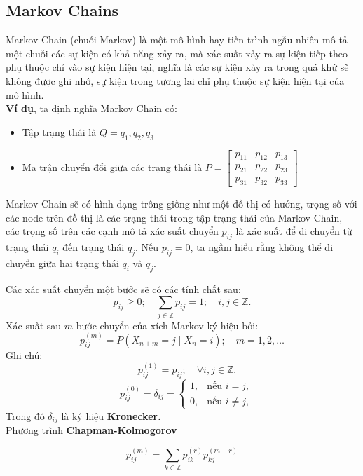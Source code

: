 \documentclass[conference]{IEEEtran}
\begin{document}
\subsection{Markov Chains}
Markov Chain (chuỗi Markov) là một mô hình hay tiến trình ngẫu nhiên mô tả một chuỗi các sự kiện có khả năng xảy ra, mà xác suất xảy ra sự kiện tiếp theo phụ thuộc chỉ vào sự kiện hiện tại, nghĩa là các sự kiện xảy ra trong quá khứ sẽ không được ghi nhớ, sự kiện trong tương lai chỉ phụ thuộc sự kiện hiện tại của mô hình.\\
\noindent \textbf{Ví dụ}, ta định nghĩa Markov Chain có:
\begin{itemize}
    \item Tập trạng thái là \( Q = q_1, q_2, q_3 \)
    \item Ma trận chuyển đổi giữa các trạng thái là \( P = \begin{bmatrix} 
    p_{11} & p_{12} & p_{13} \\ 
    p_{21} & p_{22} & p_{23} \\ 
    p_{31} & p_{32} & p_{33}
    \end{bmatrix} \) \\
\end{itemize}
\hspace{0.2cm} Markov Chain sẽ có hình dạng trông giống như một đồ thị có hướng, trọng số với các node trên đồ thị là các trạng thái trong tập trạng thái của Markov Chain, các trọng số trên các cạnh mô tả xác suất chuyển \(p_{ij}\) là xác suất để di chuyển từ trạng thái \(q_i\) đến trạng thái \(q_j\). Nếu \(p_{ij}=0\), ta ngầm hiểu rằng không thể di chuyển giữa hai trạng thái \(q_i\) và \(q_j\).

\noindent Các xác suất chuyển một bước sẽ có các tính chất sau:
\[
p_{ij} \geq 0; \quad \sum_{j \in \mathbb{Z}} p_{ij} = 1; \quad i, j \in \mathbb{Z}.
\]
\noindent Xác suất sau \( m \)-bước chuyển của xích Markov ký hiệu bởi:
\[
p_{ij}^{(m)} = P(X_{n+m} = j \mid X_n = i); \quad m=1, 2, \dots
\]
\noindent Ghi chú:
\[
\quad p_{ij}^{(1)} = p_{ij}; \quad \forall i,j \in \mathbb{Z}.
\]
\[
\quad p_{ij}^{(0)} = \delta_{ij} = \begin{cases}
1, & \text{nếu } i = j, \\
0, & \text{nếu } i \neq j,
\end{cases}
\]
Trong đó \( \delta_{ij} \) là ký hiệu \textbf{Kronecker.}\\
Phương trình\textbf{ Chapman-Kolmogorov}

\[
p_{ij}^{(m)} = \sum_{k \in \mathbb{Z}} p_{ik}^{(r)} p_{kj}^{(m-r)}
\]
\end{document}
